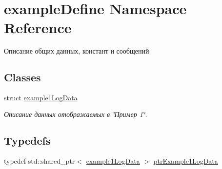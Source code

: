 \hypertarget{namespaceexample_define}{}\section{example\+Define Namespace Reference}
\label{namespaceexample_define}


Описание общих данных, констант и сообщений  


\subsection*{Classes}
\begin{DoxyCompactItemize}
\item 
struct \hyperlink{structexample_define_1_1example1_log_data}{example1\+Log\+Data}
\begin{DoxyCompactList}\small\item\em Описание данных отображаемых в \char`\"{}Пример 1\char`\"{}. \end{DoxyCompactList}\end{DoxyCompactItemize}
\subsection*{Typedefs}
\begin{DoxyCompactItemize}
\item 
typedef std\+::shared\+\_\+ptr$<$ \hyperlink{structexample_define_1_1example1_log_data}{example1\+Log\+Data} $>$ \hyperlink{namespaceexample_define_a52b69908c42e1ef6c8db4fa83f882a8d}{ptr\+Example1\+Log\+Data}
\end{DoxyCompactItemize}
